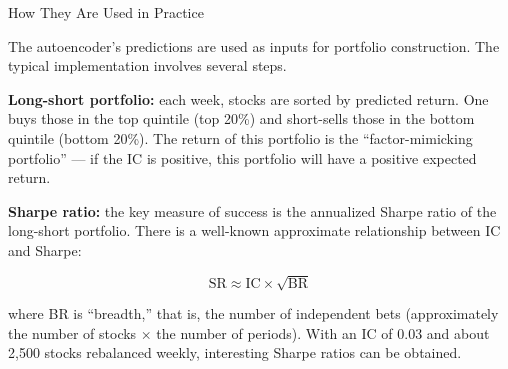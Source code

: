 \documentclass[aspectratio=169, 11pt]{beamer}
\begin{document}
%
%
\begin{frame}{How They Are Used in Practice}

The autoencoder's predictions are used as inputs for portfolio construction.
The typical implementation involves several steps.

\vspace{0.25cm}

\textbf{Long-short portfolio:} each week, stocks are sorted by predicted return. One buys
those in the top quintile (top 20\%) and short-sells those in the bottom quintile
(bottom 20\%). The return of this portfolio is the ``factor-mimicking portfolio'' ---
if the IC is positive, this portfolio will have a positive expected return.

\vspace{0.25cm}

\textbf{Sharpe ratio:} the key measure of success is the annualized Sharpe ratio of the
long-short portfolio. There is a well-known approximate relationship between IC and
Sharpe:

\vspace{0.35cm}

\[
\mathrm{SR} \approx \mathrm{IC} \times \sqrt{\mathrm{BR}}
\]

\vspace{0.35cm}

where BR is ``breadth,'' that is, the number of independent bets (approximately the
number of stocks $\times$ the number of periods). With an IC of 0.03 and about 2{,}500
stocks rebalanced weekly, interesting Sharpe ratios can be obtained.

\end{frame}
%
%

%
%

%
%

%
%

%
%


%
\end{document}

